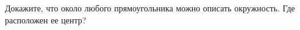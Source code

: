 \begin{ex}
	\begin{condition}
		Докажите, что около любого прямоугольника можно	описать окружность. Где расположен ее центр?
	\end{condition}
\end{ex}
